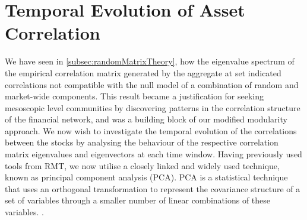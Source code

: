 \section{Temporal Evolution of Asset Correlation}
\label{sec:temporalEvolutionAssetCorrelation}

We have seen in \cref{subsec:randomMatrixTheory}, how the eigenvalue spectrum of the empirical correlation matrix generated by the aggregate at set indicated correlations not compatible with the null model of a combination of random and market-wide components.
This result became a justification for seeking mesoscopic level communities by discovering patterns in the correlation structure of the financial network, and was a building block of our modified modularity approach.
We now wish to investigate the temporal evolution of the correlations between the stocks by analysing the behaviour of the respective correlation matrix eigenvalues and eigenvectors at each time window.
Having previously used tools from RMT, we now utilise a closely linked \cite{FPW+11} and widely used technique, known as principal component analysis (PCA).
PCA is a statistical technique that uses an orthogonal transformation to represent the covariance structure of a set of variables through a smaller number of linear combinations of these variables. \cite{Jol02,FPW+11,Gil14}.

